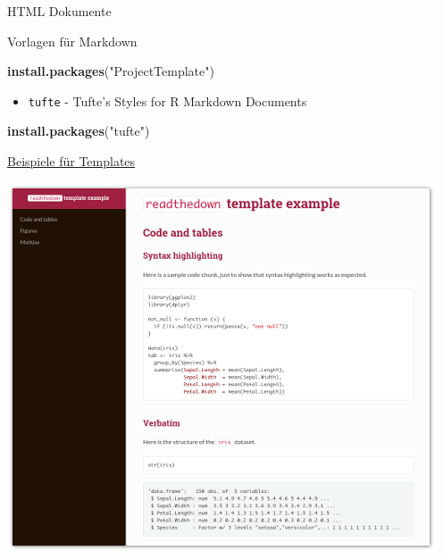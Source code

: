\documentclass[ignorenonframetext,]{beamer}
\newenvironment{Shaded}{}{}
\newcommand{\KeywordTok}[1]{\textcolor[rgb]{0.00,0.44,0.13}{\textbf{{#1}}}}
\newcommand{\StringTok}[1]{\textcolor[rgb]{0.25,0.44,0.63}{{#1}}}
\newcommand{\NormalTok}[1]{{#1}}
\providecommand{\tightlist}{%
\setlength{\itemsep}{0pt}\setlength{\parskip}{0pt}}
\begin{document}
\begin{frame}[fragile]{HTML Dokumente}
\begin{block}{Vorlagen für Markdown}
\begin{Shaded}
\begin{Highlighting}[]
\KeywordTok{install.packages}\NormalTok{(}\StringTok{"ProjectTemplate"}\NormalTok{)}
\end{Highlighting}
\end{Shaded}

\begin{itemize}
\tightlist
\item
  \texttt{tufte} - Tufte's Styles for R Markdown Documents
\end{itemize}

\begin{Shaded}
\begin{Highlighting}[]
\KeywordTok{install.packages}\NormalTok{(}\StringTok{"tufte"}\NormalTok{)}
\end{Highlighting}
\end{Shaded}

\end{block}

\begin{block}{\href{https://github.com/juba/rmdformats}{Beispiele für
Templates}}

\includegraphics{./tex2pdf.9796/073755cbbc10b721946300e9d9081f5d6077f3ce.png}

\end{block}

\end{frame}
\end{document}
